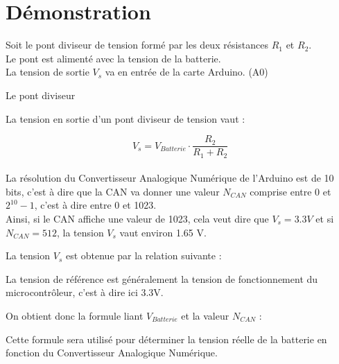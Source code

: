 

\section{Démonstration}

Soit le pont diviseur de tension formé par les deux résistances $R_1$ et $R_2$.\\
Le pont est alimenté avec la tension de la batterie.\\
La tension de sortie $V_s$ va en entrée de la carte Arduino. (A0)


\begin{schema}{Le pont diviseur}
 \end{schema}


La tension en sortie d'un pont diviseur de tension vaut :

 $$ V_s = V_{Batterie} \cdot \frac{R_2}{R_1+R_2} $$\\

 La résolution du Convertisseur Analogique Numérique de l'Arduino est de 10 bits, c'est à dire que la CAN va donner une valeur $N_{CAN}$ comprise entre 0 et $2^{10}-1$, c'est à dire entre 0 et 1023.\\

 Ainsi, si le CAN affiche une valeur de 1023, cela veut dire que $V_s=3.3V$ et si $N_{CAN}=512$, la tension $V_s$ vaut environ 1.65 V.


 La tension $V_s$ est obtenue par la relation suivante : 


 La tension de référence est généralement la tension de fonctionnement du microcontrôleur, c'est à dire ici 3.3V.

 On obtient donc la formule liant $V_{Batterie}$ et la valeur $N_{CAN}$ :



 Cette formule sera utilisé pour déterminer la tension réelle de la batterie en fonction du Convertisseur Analogique Numérique.


